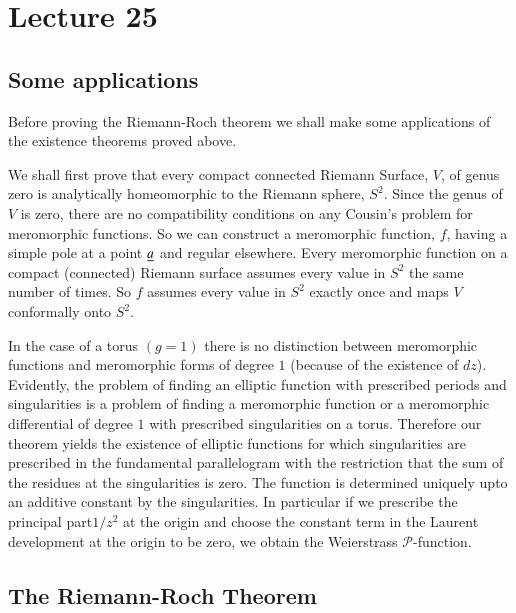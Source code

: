 \chapter{Lecture 25}

\section*{Some applications}\pageoriginale

Before proving the Riemann-Roch theorem we shall make some
applications of the existence theorems proved above.

We shall first prove that every compact connected Riemann Surface,
$V$, of genus zero is analytically homeomorphic to the Riemann sphere,
$S^{2}$. Since the genus of $V$ is zero, there are no compatibility
conditions on any Cousin's problem for meromorphic functions. So we
can construct a meromorphic function, $f$, having a simple pole at a
point $\underline{a}$ and regular elsewhere. Every meromorphic function on a
compact (connected) Riemann surface assumes every value in $S^{2}$ the
same number of times. So $f$ assumes every value in $S^{2}$ exactly
once and maps $V$ conformally onto $S^{2}$.

In the case of a torus $(g=1)$ there is no distinction between
meromorphic functions and meromorphic forms of degree $1$ (because of
the existence of $dz$). Evidently, the problem of finding an elliptic
function with prescribed periods and singularities is a problem of
finding a meromorphic function or a meromorphic differential of degree
$1$ with prescribed singularities on a torus. Therefore our theorem
yields the existence of elliptic functions for which singularities are
prescribed in the fundamental parallelogram with the restriction that
the sum of the residues at the singularities is zero. The function is
determined uniquely upto an additive constant by the singularities. In
particular if we prescribe the principal part\pageoriginale $1/z^{2}$
at the origin and choose the constant term in the Laurent development
at the origin to be zero, we obtain the Weierstrass
$\mathscr{P}$-function.

\section*{The Riemann-Roch Theorem}

